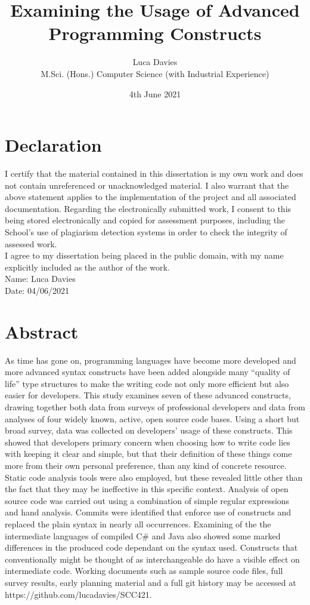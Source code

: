 \documentclass{article}
\title{\textbf{Examining the Usage of Advanced Programming Constructs}}
\author{
Luca Davies \\ M.Sci. (Hons.) Computer Science (with Industrial Experience)}
\date{4th June 2021}
\begin{document}
\maketitle

\newpage
\section*{Declaration}
    I certify that the material contained in this dissertation is my own work and does not contain unreferenced or unacknowledged material. I also warrant that the above statement applies to the implementation of the project and all associated documentation. Regarding the electronically submitted work, I consent to this being stored electronically and copied for assessment purposes, including the School’s use of plagiarism detection systems in order to check the integrity of assessed work. \\
    I agree to my dissertation being placed in the public domain, with my name explicitly included as the author of the work. \\
    
    \noindent
    Name: Luca Davies\\
    Date: 04/06/2021
\newpage
\section*{Abstract}
    As time has gone on, programming languages have become more developed and more advanced syntax constructs have been added alongside many ``quality of life'' type structures to make the writing code not only more efficient but also easier for developers. This study examines seven of these advanced constructs, drawing together both data from surveys of professional developers and data from analyses of four widely known, active, open source code bases. Using a short but broad survey, data was collected on developers' usage of these constructs. This showed that developers primary concern when choosing how to write code lies with keeping it clear and simple, but that their definition of these things come more from their own personal preference, than any kind of concrete resource. Static code analysis tools were also employed, but these revealed little other than the fact that they may be ineffective in this specific context. Analysis of open source code was carried out using a combination of simple regular expressions and hand analysis. Commits were identified that enforce use of constructs and replaced the plain syntax in nearly all occurrences. Examining of the the intermediate languages of compiled C\# and Java also showed some marked differences in the produced code dependant on the syntax used. Constructs that conventionally might be thought of as interchangeable do have a visible effect on intermediate code.
    \newline
    \newline
    Working documents such as sample source code files, full survey results, early planning material and a full git history may be accessed at https://github.com/lucadavies/SCC421.
    \newline
\newpage
\tableofcontents
\end{document}
